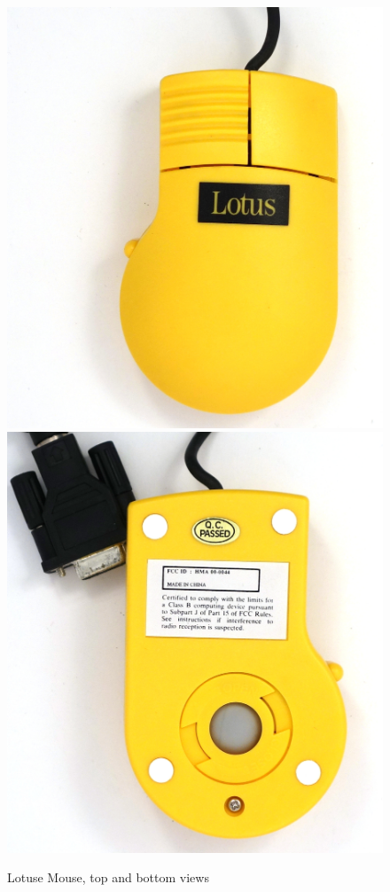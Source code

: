 \documentclass[11pt, a4paper]{article}
\begin{document}
\begin{figure}[h]
    \centering
    \includegraphics[scale=0.3]{1992_lotus_mouse/top_30.jpg}
    \includegraphics[scale=0.3]{1992_lotus_mouse/bottom_30.jpg}
    \caption{Lotuse Mouse, top and bottom views}
    \label{fig:LotusTopBottom}
\end{figure}
\end{document}

